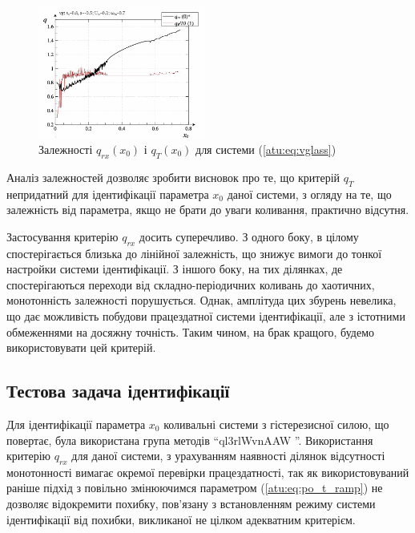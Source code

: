 \begin{figure}[ht!]
\begin{center}
  \includegraphics[width=0.49\textwidth]{p/cha/vg/vg_q1-p_q.png}
\end{center}
\caption{Залежності $ q_{rx} (x_0) $ і $ q_T (x_0) $ для системи (\ref{atu:eq:vglass})}
\label{atu:f:vglass_q}
\end{figure}

Аналіз залежностей дозволяє зробити висновок про те, що критерій
$ q_T $ непридатний для ідентифікації параметра
$ x_0 $ даної системи, з огляду на те, що залежність від параметра,
якщо не брати до уваги коливання, практично відсутня.

Застосування критерію
$ q_{rx} $ досить суперечливо. З одного боку, в цілому
спостерігається близька до лінійної залежність, що знижує
вимоги до тонкої настройки системи ідентифікації. З іншого
боку, на тих ділянках, де спостерігаються переходи від
складно-періодичних коливань до хаотичних, монотонність
залежності порушується. Однак, амплітуда цих збурень невелика,
що дає можливість побудови працездатної системи ідентифікації,
але з істотними обмеженнями на досяжну точність. Таким чином,
на брак кращого, будемо використовувати цей критерій.



\subsection{Тестова задача ідентифікації} %

Для ідентифікації параметра
$ x_0 $ коливальні системи з гістерезисної силою, що повертає, була
використана група методів ``ql3rlWvnAAW ''. Використання критерію
$ q_{rx} $ для даної системи, з урахуванням наявності ділянок
відсутності монотонності вимагає окремої перевірки
працездатності, так як використовуваний раніше підхід
з повільно змінюючимся параметром (\ref{atu:eq:po_t_ramp}) не дозволяє
відокремити похибку, пов'язану з встановленням режиму системи
ідентифікації від похибки, викликаної не цілком адекватним
критерієм.

